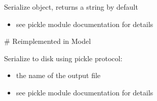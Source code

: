 \documentclass[letterpaper,10pt,english]{sphinxmanual}
\begin{document}
\begin{fulllineitems}
\begin{fulllineitems}
\begin{itemize}
\end{itemize}

\end{fulllineitems}


\begin{fulllineitems}
\label{\detokenize{modules_doc:cbmpy.CBModel.Fbase.serialize}}
\pysigstartsignatures
{}
\pysigstopsignatures
\sphinxAtStartPar
Serialize object, returns a string by default
\begin{itemize}
\item {} \begin{description}
\sphinxAtStartPar
see pickle module documentation for details

\end{description}

\end{itemize}

\sphinxAtStartPar
\# Reimplemented in Model

\end{fulllineitems}


\begin{fulllineitems}
\label{\detokenize{modules_doc:cbmpy.CBModel.Fbase.serializeToDisk}}
\pysigstartsignatures
{}
\pysigstopsignatures
\sphinxAtStartPar
Serialize to disk using pickle protocol:
\begin{itemize}
\item {} 
\sphinxAtStartPar
{} the name of the output file

\item {} \begin{description}
\sphinxAtStartPar
see pickle module documentation for details

\end{description}


\end{itemize}
\end{fulllineitems}
\end{fulllineitems}
\end{document}
